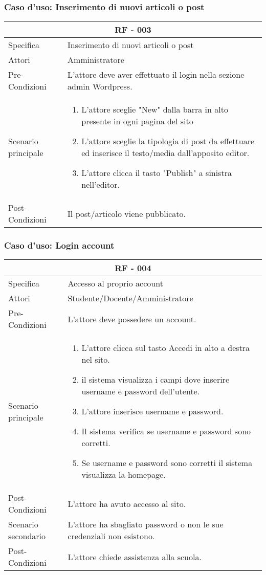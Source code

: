 \documentclass{article}
\begin{document}
\subsubsection{\textbf{Caso d'uso: Inserimento di nuovi articoli o post}}
\begin{tabular}{ |p{3cm}|p{9cm}|  }
	\hline
	\multicolumn{2}{|c|}{\textbf{RF - 003}} \\
	\hline
	Specifica& Inserimento di nuovi articoli o post\\
	\hline
	Attori& Amministratore\\
	\hline
	Pre-Condizioni& L'attore deve aver effettuato il login nella sezione admin Wordpress.\\
	\hline
	Scenario principale& \begin{enumerate}
		\item L'attore sceglie "New" dalla barra in alto presente in ogni pagina del sito
		\item L'attore sceglie la tipologia di post da effettuare ed inserisce il testo/media dall'apposito editor.
		\item L'attore clicca il tasto "Publish" a sinistra nell'editor.
	\end{enumerate}\\
	\hline
	Post-Condizioni& Il post/articolo viene pubblicato.\\
	\hline
\end{tabular}
\subsubsection{\textbf{Caso d'uso: Login account}}
\begin{tabular}{ |p{3cm}|p{9cm}|  }
	\hline
	\multicolumn{2}{|c|}{\textbf{RF - 004}} \\
	\hline
	Specifica& Accesso al proprio account\\
	\hline
	Attori& Studente/Docente/Amministratore\\
	\hline
	Pre-Condizioni& L'attore deve possedere un account.\\
	\hline
	Scenario principale& \begin{enumerate}
		\item L'attore clicca sul tasto Accedi in alto a destra nel sito.
		\item il sistema visualizza i campi dove inserire username e password dell'utente.
		\item L'attore inserisce username e password.
		\item Il sistema verifica se username e password sono corretti.
		\item Se username e password sono corretti il sistema visualizza la homepage.
	\end{enumerate}\\
	\hline
	Post-Condizioni& L'attore ha avuto accesso al sito.\\
	\hline
	Scenario secondario& L'attore ha sbagliato password o non le sue credenziali non esistono.\\
	\hline
	Post-Condizioni& L'attore chiede assistenza alla scuola.\\
	\hline
\end{tabular}
\end{document}
